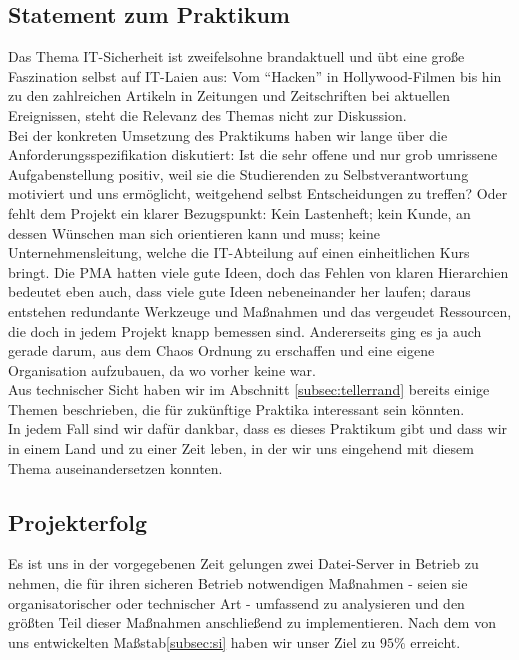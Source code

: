 \subsection{Statement zum Praktikum}
Das Thema IT-Sicherheit ist zweifelsohne brandaktuell und übt eine große Faszination selbst auf IT-Laien aus: Vom "`Hacken"' in Hollywood-Filmen bis hin zu den zahlreichen Artikeln in Zeitungen und Zeitschriften bei aktuellen Ereignissen, steht die Relevanz des Themas nicht zur Diskussion.\\

Bei der konkreten Umsetzung des Praktikums haben wir lange über die Anforderungsspezifikation diskutiert: Ist die sehr offene und nur grob umrissene Aufgabenstellung positiv, weil sie die Studierenden zu Selbstverantwortung motiviert und uns ermöglicht, weitgehend selbst Entscheidungen zu treffen? Oder fehlt dem Projekt ein klarer Bezugspunkt: Kein Lastenheft; kein Kunde, an dessen Wünschen man sich orientieren kann und muss; keine Unternehmensleitung, welche die IT-Abteilung auf einen einheitlichen Kurs bringt. Die PMA hatten viele gute Ideen, doch das Fehlen von klaren Hierarchien bedeutet eben auch, dass viele gute Ideen nebeneinander her laufen; daraus entstehen redundante Werkzeuge und Maßnahmen und das vergeudet Ressourcen, die doch in jedem Projekt knapp bemessen sind. Andererseits ging es ja auch gerade darum, aus dem Chaos Ordnung zu erschaffen und eine eigene Organisation aufzubauen, da wo vorher keine war.\\

Aus technischer Sicht haben wir im Abschnitt \ref{subsec:tellerrand} bereits einige Themen beschrieben, die für zukünftige Praktika interessant sein könnten. \\

In jedem Fall sind wir dafür dankbar, dass es dieses Praktikum gibt und dass wir in einem Land und zu einer Zeit leben, in der wir uns eingehend mit diesem Thema auseinandersetzen konnten.

\subsection{Projekterfolg}
Es ist uns in der vorgegebenen Zeit gelungen zwei Datei-Server in Betrieb zu nehmen, die für ihren sicheren Betrieb notwendigen Maßnahmen - seien sie organisatorischer oder technischer Art - umfassend zu analysieren und den größten Teil dieser Maßnahmen anschließend zu implementieren. Nach dem von uns entwickelten Maßstab\ref{subsec:si} haben wir unser Ziel zu $95\%$ erreicht. \\

